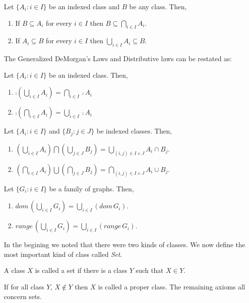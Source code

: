 \begin{Theorem}
    Let $\lbrace A_i : i \in I \rbrace$ be an indexed class and $B$ be any class. Then,
    \begin{enumerate}
	\item If $B \subseteq A_i$ for every $i \in I$ then $B \subseteq \bigcap_{i \in I} A_i$.
	\item If $A_i \subseteq B$ for every $i \in I$ then $\bigcup_{i \in I} A_i \subseteq B$.
    \end{enumerate}
\end{Theorem}

The Generalized DeMorgan's Laws and Distributive laws can be restated as:
\begin{Theorem}[name=DeMorgan's Laws]
    Let $\lbrace A_i : i \in I \rbrace$ be an indexed class. Then,
    \begin{enumerate}
	\item ${\comp{(\bigcup_{i \in I} A_i)}} = \bigcap_{i \in I} \comp{A_{i}}$
	\item ${\comp{(\bigcap_{i \in I} A_i)}} = \bigcup_{i \in I} \comp{A_{i}}$
    \end{enumerate}
\end{Theorem}

\begin{Theorem}[name=Distributive Laws]
    Let $\lbrace A_i : i \in I \rbrace$ and $\lbrace B_j : j \in J \rbrace$  be indexed classes. 
    Then,
    \begin{enumerate}
	\item ${(\bigcup_{i \in I} A_i) \bigcap (\bigcup_{j \in J} B_j) } = \bigcup_{(i,j) \in I
	    \times J} A_{i} \cap B_{j}$.
	\item ${(\bigcap_{i \in I} A_i) \bigcup (\bigcap_{j \in J} B_j) } = \bigcap_{(i,j) \in I
	    \times J} A_{i} \cup B_{j}$.
    \end{enumerate}
\end{Theorem}

\begin{Theorem}
    Let $\lbrace G_i : i \in I \rbrace$ be a family of graphs. Then,
    \begin{enumerate}
	\item $dom\,(\bigcup_{i \in I} G_i) = \bigcup_{i \in I} (dom\,G_i)$.
	\item $range\,(\bigcup_{i \in I} G_i) = \bigcup_{i \in I} (range\,G_i)$.
    \end{enumerate}
\end{Theorem}

In the begining we noted that there were two kinds of classes. We now define the most important kind
of class called \textit{Set}.
\begin{Definition}
    A class $X$ is called a set if there is a class $Y$ such that $X \in Y$.
\end{Definition}
If for all class $Y$, $X \not\in Y$ then $X$ is called a proper class. The remaining axioms all
concern sets. 

